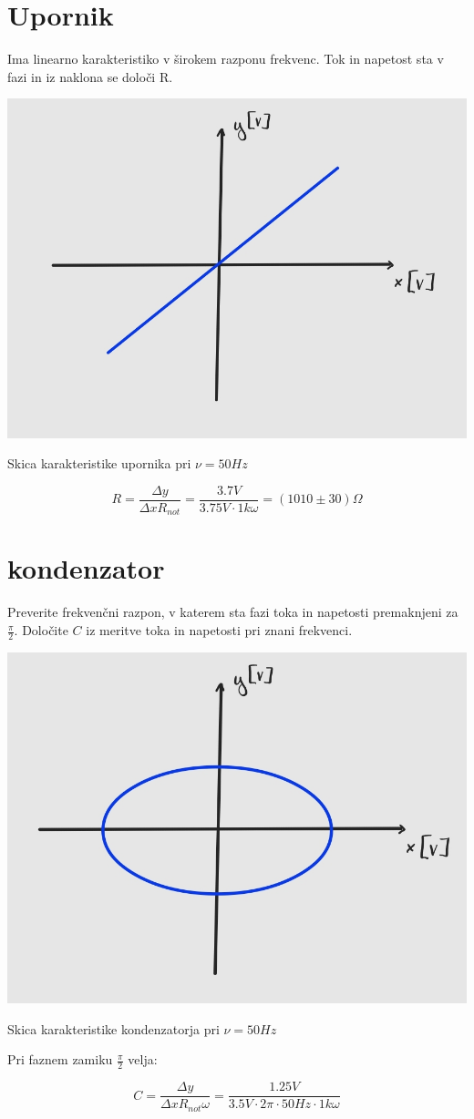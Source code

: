 \documentclass[12pt]{report}
\begin{document}
\section*{Upornik}

Ima linearno karakteristiko v širokem razponu frekvenc. Tok in napetost sta v fazi in iz naklona se določi R. 

\begin{slika}
  \centering
  \includegraphics{upornik}
  \caption{\small Skica karakteristike upornika pri $\nu = 50\si{Hz}$}
\end{slika}

\[
  R = \frac{\Delta y}{\Delta x R_{not}} = \frac{3.7\si{V}}{3.75\si{V} \cdot 1k\omega} = (1010 \pm 30) \Omega
\]

\section*{kondenzator}

Preverite frekvenčni razpon, v katerem sta fazi toka in napetosti premaknjeni za $\frac{\pi}{2}$. Določite $C$ iz meritve toka in napetosti pri znani frekvenci. 

\begin{slika}
  \centering
  \includegraphics{kondenzator}
  \caption{\small Skica karakteristike kondenzatorja pri $\nu = 50\si{Hz}$}
\end{slika}

Pri faznem zamiku $\frac{\pi}{2}$ velja: 

\[
 C = \frac{\Delta y}{\Delta x R_{not} \omega} = \frac{1.25\si{V}}{3.5\si{V}\cdot 2\pi \cdot 50\si{Hz} \cdot 1k\omega}
\]
\end{document}
